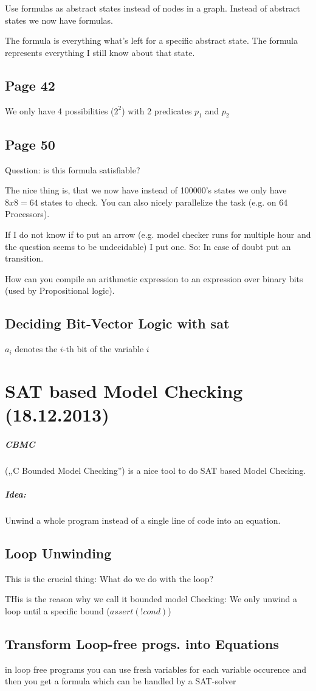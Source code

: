 \documentclass[a4paper]{article}
\begin{document}
Use formulas as abstract states instead of nodes in a graph. Instead of abstract
states we now have formulas.

The formula is everything what's left for a specific abstract state. The formula
represents everything I still know about that state.

\subsection{Page 42}
We only have 4 possibilities ($2^2$) with 2 predicates $p_1$ and $p_2$

\subsection{Page 50}
Question: is this formula satisfiable?

The nice thing is, that we now have instead of 100000's states we only have
$8x8=64$ states to check. You can also nicely parallelize the task (e.g. on 64
Processors).

If I do not know if to put an arrow (e.g. model checker runs for multiple hour
and the question seems to be undecidable) I put one. So: In case of doubt put an
transition.


How can you compile an arithmetic expression to an expression over binary bits
(used by Propositional logic).


\subsection{Deciding Bit-Vector Logic with sat}
$a_i$ denotes the $i$-th bit of the variable $i$



\section{SAT based Model Checking (18.12.2013)}

\subparagraph{CBMC} (,,C Bounded Model Checking'') is a nice tool to do SAT
based Model Checking.

\subparagraph{Idea:} Unwind a whole program instead of a single line of code
into an equation.

\subsection{Loop Unwinding}
This is the crucial thing: What do we do with the loop?

THis is the reason why we call it bounded model Checking: We only unwind a loop
until a specific bound ($assert(!cond)$)

\subsection{Transform Loop-free progs. into Equations}
in loop free programs you can use fresh variables for each variable occurence
and then you get a formula which can be handled by a SAT-solver
\end{document}
